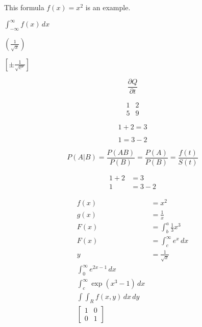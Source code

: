 \documentclass{article}
\begin{document}
This formula $f(x) = x^2$ is an example. \par             %
$ \int^\infty_{-\infty} f(x)\,dx$   \par
$ \left(\frac{1}{\sqrt{x}}\right)$  \par
$ \left[\pm\frac{1}{\sqrt{e^x}}\right]$


\begin{equation}
\frac{\partial Q}{\partial t}
\end{equation}


\begin{equation}
\begin{matrix}
1 & 2\\
5 & 9
\end{matrix}
\end{equation}


\begin{equation*}
  1 + 2 = 3 
\end{equation*}

\begin{equation*}
  1 = 3 - 2
\end{equation*}


\begin{equation*}
  P(A|B) = \frac{P(AB)}{P(B)}=\frac{P(A)}{P(B)}=\frac{f(t)}{S(t)}
\end{equation*}


\begin{align*}
  1 + 2 &= 3\\
  1 &= 3 - 2
\end{align*}


\begin{align*}
  f(x) &= x^2\\
  g(x) &= \frac{1}{x}\\
  F(x) &= \int^a_b \frac{1}{3}x^3\\
  F(x) &= \int^\infty_c e^x\,dx\\                %
  y &= \frac{1}{\sqrt{x}}\\
  \int^\infty_0 e^{2x-1}\,dx\\
  \int^\infty_c \exp{(x^3-1)}\,dx\\
  \int \!\!\! \int_R f(x,y)\,dx\,dy\\
\left[
\begin{matrix}
1 & 0\\
0 & 1
\end{matrix}
\right]
\end{align*}
\end{document}

